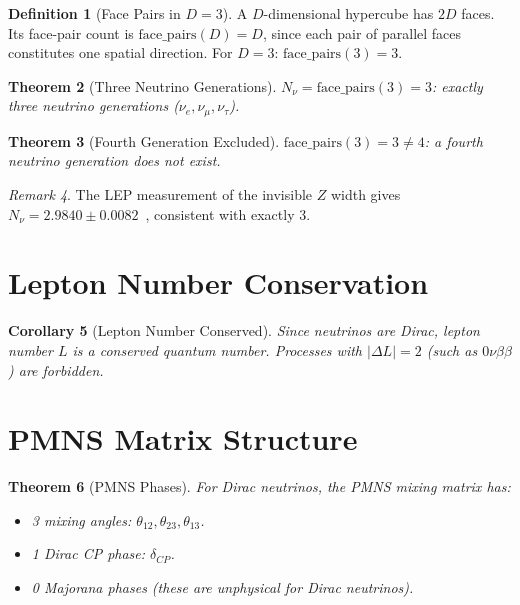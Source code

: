 \documentclass[12pt,a4paper]{article}
\newtheorem{theorem}{Theorem}[section]
\newtheorem{corollary}[theorem]{Corollary}
\theoremstyle{definition}
\newtheorem{definition}[theorem]{Definition}
\theoremstyle{remark}
\newtheorem{remark}[theorem]{Remark}
\begin{document}
\begin{definition}[Face Pairs in $D = 3$]
A $D$-dimensional hypercube has $2D$ faces.  Its face-pair count
is $\mathrm{face\_pairs}(D) = D$, since each pair of parallel
faces constitutes one spatial direction.  For $D = 3$:
$\mathrm{face\_pairs}(3) = 3$.
\end{definition}

\begin{theorem}[Three Neutrino Generations]
\label{thm:three}
$N_\nu = \mathrm{face\_pairs}(3) = 3$: exactly three neutrino
generations ($\nu_e, \nu_\mu, \nu_\tau$).
\end{theorem}

\begin{theorem}[Fourth Generation Excluded]
\label{thm:no-fourth}
$\mathrm{face\_pairs}(3) = 3 \neq 4$: a fourth neutrino
generation does not exist.
\end{theorem}

\begin{remark}
The LEP measurement of the invisible $Z$ width gives
$N_\nu = 2.9840 \pm 0.0082$~\cite{LEP2006}, consistent with
exactly 3.
\end{remark}

\section{Lepton Number Conservation}
\label{sec:lepton}

\begin{corollary}[Lepton Number Conserved]
Since neutrinos are Dirac, lepton number $L$ is a conserved
quantum number.  Processes with $|\Delta L| = 2$ (such as
$0\nu\beta\beta$) are forbidden.
\end{corollary}

\section{PMNS Matrix Structure}
\label{sec:pmns}

\begin{theorem}[PMNS Phases]
For Dirac neutrinos, the PMNS mixing matrix has:
\begin{itemize}
  \item 3 mixing angles: $\theta_{12}, \theta_{23}, \theta_{13}$.
  \item 1 Dirac CP phase: $\delta_{CP}$.
  \item 0 Majorana phases (these are unphysical for Dirac
  neutrinos).
\end{itemize}
\end{theorem}
\end{document}
